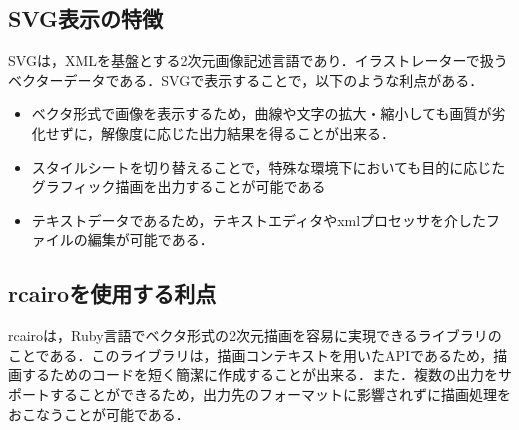 \subsection{SVG表示の特徴}
SVGは，XMLを基盤とする2次元画像記述言語であり．イラストレーターで扱うベクターデータである\cite{svg}．SVGで表示することで，以下のような利点がある．

\begin{itemize}
\item ベクタ形式で画像を表示するため，曲線や文字の拡大・縮小しても画質が劣化せずに，解像度に応じた出力結果を得ることが出来る．
\item スタイルシートを切り替えることで，特殊な環境下においても目的に応じたグラフィック描画を出力することが可能である
\item テキストデータであるため，テキストエディタやxmlプロセッサを介したファイルの編集が可能である．
\end{itemize}
\subsection{rcairoを使用する利点}
rcairoは，Ruby言語でベクタ形式の2次元描画を容易に実現できるライブラリのことである．このライブラリは，描画コンテキストを用いたAPIであるため，描画するためのコードを短く簡潔に作成することが出来る．また．複数の出力をサポートすることができるため，出力先のフォーマットに影響されずに描画処理をおこなうことが可能である\cite{cairo}．

